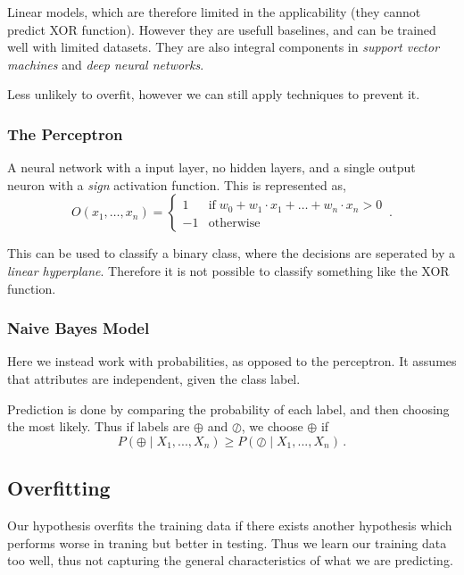 Linear models, which are therefore limited in the applicability (they cannot predict XOR function).
However they are usefull baselines, and can be trained well with limited datasets.
They are also integral components in \emph{support vector machines} and \emph{deep neural networks}.

Less unlikely to overfit, however we can still apply techniques to prevent it.

\subsubsection{The Perceptron}

A neural network with a input layer, no hidden layers, and a single output neuron with a \emph{sign} activation function.
This is represented as,
\[
    O(x_1, \dots, x_n) = \left\{
        \begin{array}{ll}
            1 & \mathrm{if}\; w_0 + w_1 \cdot x_1 + \dots + w_n \cdot x_n > 0 \\
            -1 & \mathrm{otherwise}
        \end{array}
        \right.\,.
\]

This can be used to classify a binary class, where the decisions are seperated by a \emph{linear hyperplane}.
Therefore it is not possible to classify something like the XOR function.

\subsubsection{Naive Bayes Model}

Here we instead work with probabilities, as opposed to the perceptron.
It assumes that attributes are independent, given the class label.

Prediction is done by comparing the probability of each label, and then choosing the most likely.
Thus if labels are $\oplus$ and $\oslash$, we choose $\oplus$ if
\[
    P(\oplus \mid X_1, ..., X_n) \geq P(\oslash \mid X_1, ..., X_n)\,.
\]

\subsection{Overfitting}

Our hypothesis overfits the training data if there exists another hypothesis which performs worse in traning but better in testing.
Thus we learn our training data too well, thus not capturing the general characteristics of what we are predicting.

